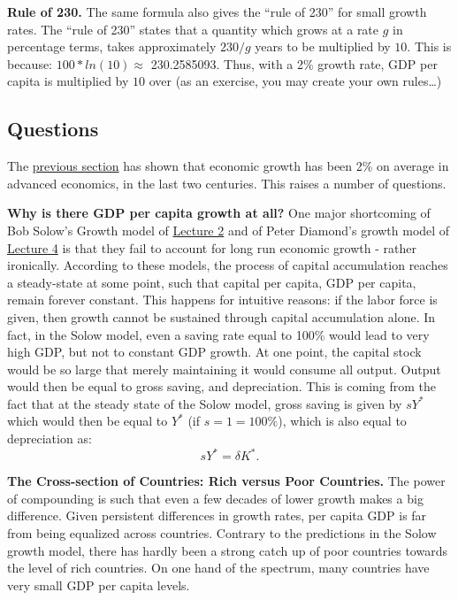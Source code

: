 \documentclass[]{book}
\theoremstyle{definition}
\theoremstyle{definition}
\theoremstyle{definition}
\theoremstyle{remark}
\begin{document}
\textbf{Rule of 230.} The same formula also gives the ``rule of 230''
for small growth rates. The ``rule of 230'' states that a quantity which
grows at a rate \(g\) in percentage terms, takes approximately \(230/g\)
years to be multiplied by \(10\). This is because:
\(100*ln(10) \approx\) 230.2585093. Thus, with a 2\% growth rate, GDP
per capita is multiplied by \(10\) over (as an exercise, you may create
your own rules\ldots{})

\subsection{Questions}\label{questions}

The \protect\hyperlink{long-run-growth}{previous section} has shown that
economic growth has been 2\% on average in advanced economics, in the
last two centuries. This raises a number of questions.

\textbf{Why is there GDP per capita growth at all?} One major
shortcoming of Bob Solow's Growth model of
\protect\hyperlink{solow}{Lecture 2} and of Peter Diamond's growth model
of \protect\hyperlink{olg}{Lecture 4} is that they fail to account for
long run economic growth - rather ironically. According to these models,
the process of capital accumulation reaches a steady-state at some
point, such that capital per capita, GDP per capita, remain forever
constant. This happens for intuitive reasons: if the labor force is
given, then growth cannot be sustained through capital accumulation
alone. In fact, in the Solow model, even a saving rate equal to 100\%
would lead to very high GDP, but not to constant GDP growth. At one
point, the capital stock would be so large that merely maintaining it
would consume all output. Output would then be equal to gross saving,
and depreciation. This is coming from the fact that at the steady state
of the Solow model, gross saving is given by \(s Y^{*}\) which would
then be equal to \(Y^{*}\) (if \(s=1=100\%\)), which is also equal to
depreciation as: \[s Y^{*}=\delta K^{*}.\]

\textbf{The Cross-section of Countries: Rich versus Poor Countries.} The
power of compounding is such that even a few decades of lower growth
makes a big difference. Given persistent differences in growth rates,
per capita GDP is far from being equalized across countries. Contrary to
the predictions in the Solow growth model, there has hardly been a
strong catch up of poor countries towards the level of rich countries.
On one hand of the spectrum, many countries have very small GDP per
capita levels.
\end{document}
